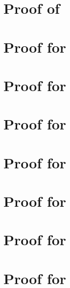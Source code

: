 \documentclass[a4paper,11pt]{book}
\begin{document}
\chapter{Proof of \textsc{}}\label{PRO_BAYES_IGSSM_KNOWN_IID_MINIMAX_NP}

%
\chapter{Proof for }\label{PRO_FREQ_IGSSM_KNOWN_IID_ORACLE_NP}

\chapter{Proof for }\label{PRO_FREQ_IGSSM_KNOWN_IID_MINIMAX_NP}

\chapter{Proof for }\label{PRO_FREQ_CIRCDECONV_KNOWN_IID_ORACLE_P}

\chapter{Proof for }\label{PRO_FREQ_CIRCDECONV_KNOWN_IID_ORACLE_NP}

\chapter{Proof for }\label{PRO_FREQ_CIRCDECONV_KNOWN_IID_ORACLE_NP_FAST}

\chapter{Proof for \textsc{}}\label{PRO_FREQ_CIRCDECONV_KNOWN_BETA_ORACLE_NP}

\chapter{Proof for }\label{PRO_FREQ_CIRCDECONV_UNKNOWN_IID_ORACLE_P}

\end{document}
